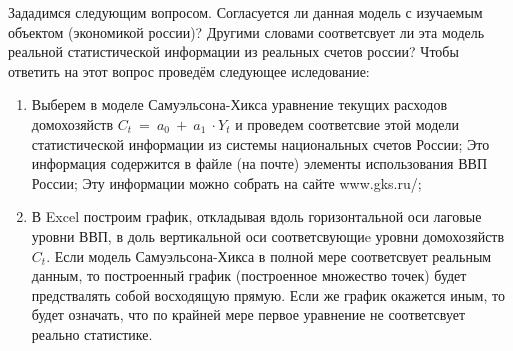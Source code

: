 \documentclass[12pt,a4paper]{article}
\begin{document}
	Зададимся следующим вопросом. Согласуется ли данная модель с изучаемым объектом (экономикой россии)? Другими словами соответсвует ли эта модель реальной статистической информации из реальных счетов россии? Чтобы ответить на этот вопрос проведём следующее иследование:
\begin{enumerate}
\item Выберем в моделе Самуэльсона-Хикса уравнение текущих расходов домохозяйств $\displaystyle C_{t} \ =\ a_{0} \ +\ a_{1} \ \cdot Y_{t}$ и проведем соответсвие этой модели статистической информации из системы национальных счетов России; Это информация содержится в файле (на почте) элементы использования ВВП России; Эту информации можно собрать на сайте www.gks.ru/;
\item В Excel построим график, откладывая вдоль горизонтальной оси лаговые уровни ВВП, в доль вертикальной оси соответсвующиe уровни домохозяйств $\displaystyle C_{t}$. Если модель Самуэльсона-Хикса в полной мере соответсвует реальным данным, то построенный график (построенное множество точек) будет предствалять собой восходящую прямую. Если же график окажется иным, то будет означать, что по крайней мере первое уравнение не соответсвует реально статистике.
\begin{figure}[H]
\begin{center}

\end{center}
\end{figure}
\end{enumerate}
\end{document}
